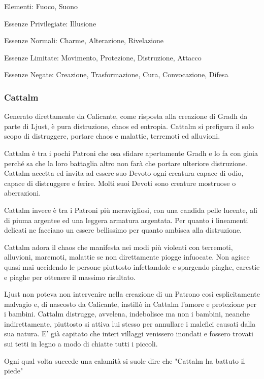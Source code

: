 \documentclass[a4paper,11pt,twoside,openany]{book}
\begin{document}
{\bigskip

Elementi: Fuoco, Suono

\bigskip

Essenze Privilegiate: Illusione

Essenze Normali: Charme, Alterazione, Rivelazione

Essenze Limitate: Movimento, Protezione, Distruzione, Attacco

Essenze Negate: Creazione, Trasformazione, Cura, Convocazione, Difesa

\subsubsection{Cattalm}

\label{cattalm}

Generato direttamente da Calicante, come risposta alla creazione di Gradh da parte di Ljust, è pura distruzione, chaos ed entropia. Cattalm si prefigura il solo scopo di distruggere, portare chaos e malattie, terremoti ed alluvioni.

Cattalm è tra i pochi Patroni che osa sfidare apertamente Gradh e lo fa con gioia perché sa che la loro battaglia altro non farà che portare ulteriore distruzione. Cattalm accetta ed invita ad essere suo Devoto ogni creatura capace di odio, capace di distruggere e ferire. Molti suoi Devoti sono creature mostruose o aberrazioni.

Cattalm invece è tra i Patroni più meravigliosi, con una candida pelle lucente, ali di piuma argentee ed una leggera armatura argentata. Per quanto i lineamenti delicati ne facciano un essere bellissimo per quanto ambisca alla distruzione.

Cattalm adora il chaos che manifesta nei modi più violenti con terremoti, alluvioni, maremoti, malattie se non direttamente piogge infuocate. Non agisce quasi mai uccidendo le persone piuttosto infettandole e spargendo piaghe, carestie e piaghe per ottenere il massimo risultato.

Ljust non poteva non intervenire nella creazione di un Patrono così esplicitamente malvagio e, di nascosto da Calicante, instillò in Cattalm l'amore e protezione per i bambini. Cattalm distrugge, avvelena, indebolisce ma non i bambini, neanche indirettamente, piuttosto si attiva lui stesso per annullare i malefici causati dalla sua natura.
E' già capitato che interi villaggi venissero inondati e fossero trovati sui tetti in legno a modo di chiatte tutti i piccoli.

Ogni qual volta succede una calamità si suole dire che "Cattalm ha battuto il piede"

}
\end{document}
